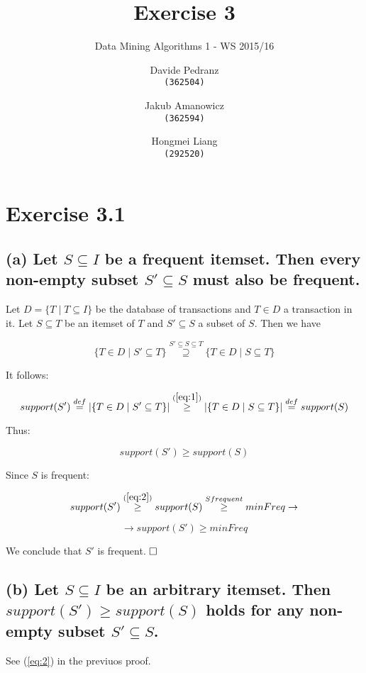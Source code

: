 \documentclass{scrartcl}
\title{Exercise 3}
\subtitle{Data Mining Algorithms 1 - WS 2015/16}
\author{
  Davide Pedranz\\ \texttt{(362504)}
  \and
  Jakub Amanowicz \\ \texttt{(362594)}
  \and
  Hongmei Liang\\  \texttt{(292520)}
}
\newcommand{\qed}{$\hfill\square$}
\begin{document}
\maketitle

\section*{Exercise 3.1}

\subsection*{(a) Let $S \subseteq I$ be a frequent itemset. Then every non-empty subset $S' \subseteq S$ must also be
frequent.}

Let $D = \{T \mid T \subseteq I\}$ be the database of transactions and $T \in D$ a transaction in it.
Let $S \subseteq T$ be an itemset of $T$  and $S' \subseteq S$ a subset of $S$. Then we have

\begin{equation} \label{eq:1}
\{ T \in D \mid S' \subseteq T \} \overset{S' \subseteq S \subseteq T}{\supseteq}  \{ T \in D \mid S \subseteq T \}
\end{equation}

It follows:

\begin{equation*}
support(S') \overset{def}{=} |\{ T \in D \mid S' \subseteq T \}| \overset{(\ref{eq:1})}{\geq} |\{ T \in D \mid S \subseteq T \}| \overset{def}{=} support(S)
\end{equation*}

Thus:

\begin{equation} \label{eq:2}
support(S') \geq support(S)
\end{equation}

Since $S$ is frequent:

\begin{equation*}
support(S') \overset{(\ref{eq:2})}{\geq} support(S) \overset{S frequent}{\geq} minFreq
\rightarrow
\end{equation*}

\begin{equation*}
\rightarrow
support(S') \geq minFreq
\end{equation*}

We conclude that $S'$ is frequent. \qed

\subsection*{(b) Let $S \subseteq I$ be an arbitrary itemset. Then $support(S') \geq support(S)$ holds for any non-empty subset $S' \subseteq S$.}

See (\ref{eq:2}) in the previuos proof.
\end{document}
